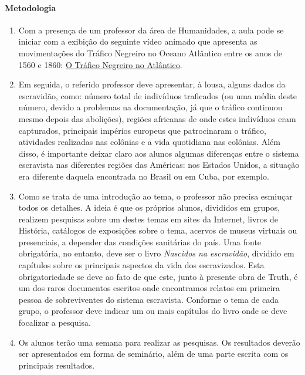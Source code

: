 \documentclass[11pt]{extarticle}
\begin{document}
\paragraph{Metodologia}

   \begin{enumerate}
    \item
    Com a presença de um professor da área de Humanidades, a aula pode se iniciar 
    com a exibição do seguinte vídeo animado
    que apresenta as movimentações do Tráfico Negreiro no Oceano Atlântico
    entre os anos de 1560 e 1860:
    \href{https://www.youtube.com/watch?v=aMyg2Cmukmo}{O Tráfico Negreiro no Atlântico}.


    \item
    Em seguida, o referido professor deve apresentar, à lousa, alguns dados da escravidão,
    como: número total de indivíduos traficados (ou uma média deste número, devido a problemas
    na documentação, já que o tráfico continuou mesmo depois das abolições), regiões africanas
    de onde estes indivíduos eram capturados, principais impérios europeus que patrocinaram
    o tráfico, atividades realizadas nas colônias e a vida quotidiana nas colônias. Além disso, 
    é importante deixar claro aos alunos algumas diferenças entre o sistema escravista
    nas diferentes regiões das Américas: nos Estados Unidos, a situação era diferente daquela
    encontrada no Brasil ou em Cuba, por exemplo. 

    \item
    Como se trata de uma introdução ao tema, o professor não precisa esmiuçar todos os detalhes.
    A ideia é que os próprios alunos, divididos em grupos, realizem pesquisas sobre um destes
    temas em sites da Internet, livros de História, catálogos de exposições sobre o tema,
    acervos de museus virtuais ou presenciais, a depender das condições sanitárias do país. 
    Uma fonte obrigatória, no entanto, deve ser o livro \emph{Nascidos na escravidão}, dividido
    em capítulos sobre os principais aspectos da vida dos escravizados. Esta obrigatoriedade
    se deve ao fato de que este, junto à presente obra de Truth, é um dos raros
    documentos escritos onde encontramos relatos em primeira pessoa de 
    sobreviventes do sistema escravista. Conforme o tema de cada grupo, o professor deve
    indicar um ou mais capítulos do livro onde se deve focalizar a pesquisa.

    \item
    Os alunos terão uma semana para realizar as pesquisas. Os resultados deverão ser apresentados 
    em forma de seminário, além de uma parte escrita com os principais resultados.

   \end{enumerate}
\end{document}
